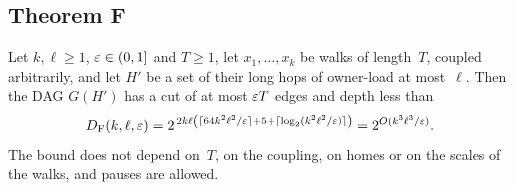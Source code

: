 \subsection{Theorem F}\label{sec:nest-F}

\begin{theorem}\label{thm:F}
Let $k,\ell\ge1$, $\varepsilon\in(0,1]$ and $T\ge1$, let $x_1,\dots,x_k$ be walks of length~$T$, coupled arbitrarily, and let $H'$
be a set of their long hops of owner-load at most~$\ell$. Then the DAG $G(H')$ has a cut of at most $\varepsilon T$ edges and depth
less than
\[
  D_{\mathrm F}(k,\ell,\varepsilon)=2^{\,2k\ell\left(\lceil64k^2\ell^2/\varepsilon\rceil+5+\lceil\log_2(k^2\ell^2/\varepsilon)\rceil\right)}
  =2^{O(k^3\ell^3/\varepsilon)}.
\]
The bound does not depend on~$T$, on the coupling, on homes or on the scales of the walks, and pauses are allowed.
\end{theorem}

